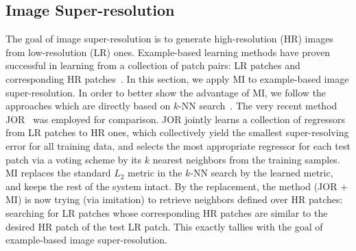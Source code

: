 \documentclass[10pt,twocolumn,letterpaper]{article}
\begin{document}
\subsection{Image Super-resolution}
The goal of image super-resolution is to generate high-resolution (HR) images from
low-resolution (LR) ones. Example-based learning methods have proven
successful in learning from a collection of patch pairs: LR patches
and corresponding HR patches~\cite{Chang-CVPR-2004, Timofte-ICCV-2013,
  Dong-ECCV-2014, JOR:EG15}. In this section, we apply MI to
example-based image super-resolution. In order to better show the
advantage of MI, we follow the approaches which are directly based on $k$-NN
search~\cite{Freeman-CGA-2002, Chang-CVPR-2004, JOR:EG15}. The very
recent method JOR~\cite{JOR:EG15} was employed for comparison. JOR
jointly learns a collection of regressors from LR patches to HR ones,
which collectively yield the smallest super-resolving error for all
training data, and selects the most appropriate regressor for each
test patch via a voting scheme by its $k$ nearest neighbors from the
training samples. MI replaces the standard $L_2$ metric in the $k$-NN
search by the learned metric, and keeps the rest of the system
intact.
By the replacement, the method (JOR + MI) is now trying (via imitation) to
retrieve neighbors defined over HR patches: searching for LR patches
whose corresponding HR patches are similar to the desired HR patch of
the test LR patch.  This exactly tallies with the goal of
example-based image super-resolution.
\end{document}
